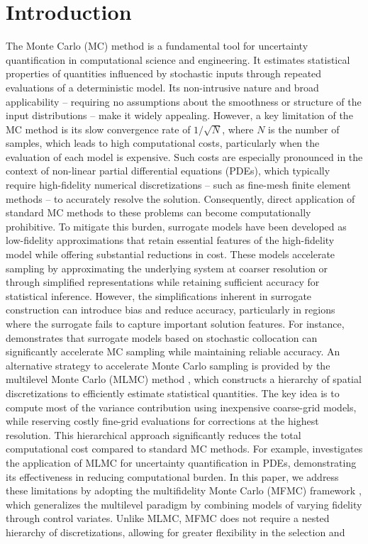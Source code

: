 
\section{Introduction}\label{sec:intro}
The Monte Carlo (MC) method is a fundamental tool for uncertainty quantification in computational science and engineering. It estimates statistical properties of quantities influenced by stochastic inputs through repeated evaluations of a deterministic model. Its non-intrusive nature and broad applicability -- requiring no assumptions about the smoothness or structure of the input distributions -- make it widely appealing. However, a key limitation of the MC method is its slow convergence rate of $1/\sqrt{N}$, where $N$ is the number of samples, which leads to high computational costs, particularly when the evaluation of each model is expensive. Such costs are especially pronounced in the context of non-linear partial differential equations (PDEs), which typically require high-fidelity numerical discretizations -- such as fine-mesh finite element methods -- to accurately resolve the solution. Consequently, direct application of standard MC methods to these problems can become computationally prohibitive. To mitigate this burden, surrogate models have been developed as low-fidelity approximations that retain essential features of the high-fidelity model while offering substantial reductions in cost. These models accelerate sampling by approximating the underlying system at coarser resolution or through simplified representations while retaining sufficient accuracy for statistical inference. However, the simplifications inherent in surrogate construction can introduce bias and reduce accuracy, particularly in regions where the surrogate fails to capture important solution features. For instance, \cite{ElLiSa:2022} demonstrates that surrogate models based on stochastic collocation can significantly accelerate MC sampling while maintaining reliable accuracy. An alternative strategy to accelerate Monte Carlo sampling is provided by the multilevel Monte Carlo (MLMC) method \cite{BaScZo:2011,Gi:2008,Gi:2015}, which constructs a hierarchy of spatial discretizations to efficiently estimate statistical quantities. The key idea is to compute most of the variance contribution using inexpensive coarse-grid models, while reserving costly fine-grid evaluations for corrections at the highest resolution. This hierarchical approach significantly reduces the total computational cost compared to standard MC methods. For example, \cite{ElLiSa:2023} investigates the application of MLMC for uncertainty quantification in PDEs, demonstrating its effectiveness in reducing computational burden. In this paper, we address these limitations by adopting the multifidelity Monte Carlo (MFMC) framework \cite{PeGuWi:2018,PeWiGu:2016,PeGuWi:2018}, which generalizes the multilevel paradigm by combining models of varying fidelity through control variates. Unlike MLMC, MFMC does not require a nested hierarchy of discretizations, allowing for greater flexibility in the selection and 